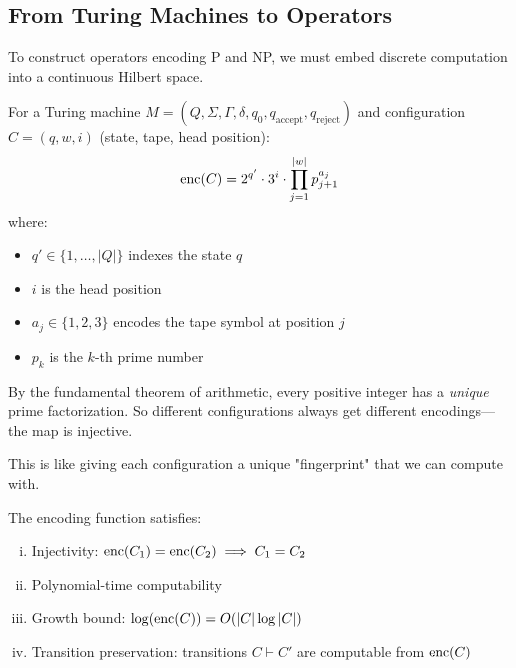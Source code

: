\subsection{From Turing Machines to Operators}

To construct operators encoding P and NP, we must embed discrete computation into a continuous Hilbert space.

\begin{definition}\label{def:config-encoding}
For a Turing machine $M = (Q, \Sigma, \Gamma, \delta, q_0, q_{\text{accept}}, q_{\text{reject}})$ and configuration $C = (q, w, i)$ (state, tape, head position):
\begin{equation}
\operatorname{enc}(C) = 2^{q'} \cdot 3^{i} \cdot \prod_{j=1}^{|w|} p_{j+1}^{a_j}
\end{equation}
where:
\begin{itemize}
\item $q' \in \{1, \ldots, |Q|\}$ indexes the state $q$
\item $i$ is the head position
\item $a_j \in \{1,2,3\}$ encodes the tape symbol at position $j$
\item $p_k$ is the $k$-th prime number
\end{itemize}
\end{definition}

\begin{intuitive}
By the fundamental theorem of arithmetic, every positive integer has a \textit{unique} prime factorization. So different configurations always get different encodings—the map is injective.

This is like giving each configuration a unique "fingerprint" that we can compute with.
\end{intuitive}

\begin{lemma}\label{lem:encoding-props}
The encoding function satisfies:
\begin{enumerate}[(i)]
\item Injectivity: $\operatorname{enc}(C_1) = \operatorname{enc}(C_2) \implies C_1 = C_2$
\item Polynomial-time computability
\item Growth bound: $\log(\operatorname{enc}(C)) = O(|C| \log |C|)$
\item Transition preservation: transitions $C \vdash C'$ are computable from $\operatorname{enc}(C)$
\end{enumerate}
\end{lemma}

